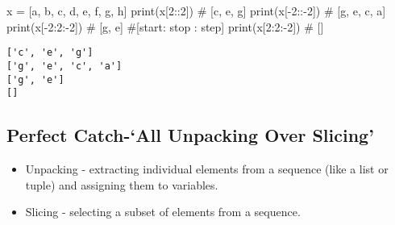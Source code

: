 \documentclass[
]{report}
\newenvironment{Shaded}{\begin{snugshade}}{\end{snugshade}}
\newcommand{\BuiltInTok}[1]{\textcolor[rgb]{0.00,0.23,0.31}{#1}}
\newcommand{\CommentTok}[1]{\textcolor[rgb]{0.37,0.37,0.37}{#1}}
\newcommand{\DecValTok}[1]{\textcolor[rgb]{0.68,0.00,0.00}{#1}}
\newcommand{\NormalTok}[1]{\textcolor[rgb]{0.00,0.23,0.31}{#1}}
\newcommand{\OperatorTok}[1]{\textcolor[rgb]{0.37,0.37,0.37}{#1}}
\newcommand{\StringTok}[1]{\textcolor[rgb]{0.13,0.47,0.30}{#1}}
\providecommand{\tightlist}{%
  \setlength{\itemsep}{0pt}\setlength{\parskip}{0pt}}\usepackage{longtable,booktabs,array}
\begin{document}
\begin{Shaded}
\begin{Highlighting}[]
\NormalTok{x }\OperatorTok{=}\NormalTok{ [}\StringTok{\textquotesingle{}a\textquotesingle{}}\NormalTok{, }\StringTok{\textquotesingle{}b\textquotesingle{}}\NormalTok{, }\StringTok{\textquotesingle{}c\textquotesingle{}}\NormalTok{, }\StringTok{\textquotesingle{}d\textquotesingle{}}\NormalTok{, }\StringTok{\textquotesingle{}e\textquotesingle{}}\NormalTok{, }\StringTok{\textquotesingle{}f\textquotesingle{}}\NormalTok{, }\StringTok{\textquotesingle{}g\textquotesingle{}}\NormalTok{, }\StringTok{\textquotesingle{}h\textquotesingle{}}\NormalTok{]}
\BuiltInTok{print}\NormalTok{(x[}\DecValTok{2}\NormalTok{::}\DecValTok{2}\NormalTok{])     }\CommentTok{\# [\textquotesingle{}c\textquotesingle{}, \textquotesingle{}e\textquotesingle{}, \textquotesingle{}g\textquotesingle{}]}
\BuiltInTok{print}\NormalTok{(x[}\OperatorTok{{-}}\DecValTok{2}\NormalTok{::}\OperatorTok{{-}}\DecValTok{2}\NormalTok{])   }\CommentTok{\# [\textquotesingle{}g\textquotesingle{}, \textquotesingle{}e\textquotesingle{}, \textquotesingle{}c\textquotesingle{}, \textquotesingle{}a\textquotesingle{}]}
\BuiltInTok{print}\NormalTok{(x[}\OperatorTok{{-}}\DecValTok{2}\NormalTok{:}\DecValTok{2}\NormalTok{:}\OperatorTok{{-}}\DecValTok{2}\NormalTok{])  }\CommentTok{\# [\textquotesingle{}g\textquotesingle{}, \textquotesingle{}e\textquotesingle{}]  \#[start: stop : step]}
\BuiltInTok{print}\NormalTok{(x[}\DecValTok{2}\NormalTok{:}\DecValTok{2}\NormalTok{:}\OperatorTok{{-}}\DecValTok{2}\NormalTok{])   }\CommentTok{\# []}
\end{Highlighting}
\end{Shaded}

\begin{verbatim}
['c', 'e', 'g']
['g', 'e', 'c', 'a']
['g', 'e']
[]
\end{verbatim}

\hypertarget{perfect-catch-all-unpacking-over-slicing}{%
\subsection{Perfect Catch-`All Unpacking Over
Slicing'}\label{perfect-catch-all-unpacking-over-slicing}}

\begin{itemize}
\tightlist
\item
  Unpacking - extracting individual elements from a sequence (like a
  list or tuple) and assigning them to variables.
\item
  Slicing - selecting a subset of elements from a sequence.
\end{itemize}
\end{document}
